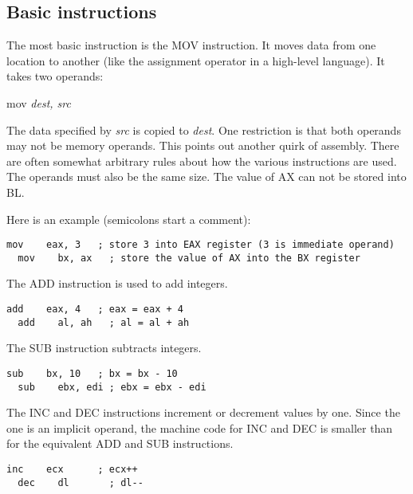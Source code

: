 \subsection{Basic instructions}

The most basic instruction is the {\code MOV}  instruction. It moves
data from one location to another (like the assignment operator in a
high-level language). It takes two operands:
\begin{CodeQuote}
  mov {\em dest, src}
\end{CodeQuote}
The data specified by {\em src} is copied to {\em dest\/}. One restriction
is that both operands may not be memory operands. This points out another
quirk of assembly. There are often somewhat arbitrary rules about how the
various instructions are used. The operands must also be the same size. The
value of AX can not be stored into BL.


Here is an example (semicolons start a comment):
\begin{lstlisting}[language={[x86masm]Assembler}]
  mov    eax, 3   ; store 3 into EAX register (3 is immediate operand)
  mov    bx, ax   ; store the value of AX into the BX register
\end{lstlisting}

The {\code ADD}  instruction is used to add integers.
\begin{lstlisting}[language={[x86masm]Assembler}]
  add    eax, 4   ; eax = eax + 4
  add    al, ah   ; al = al + ah
\end{lstlisting}

The {\code SUB}  instruction subtracts integers.
\begin{lstlisting}[language={[x86masm]Assembler}]
  sub    bx, 10   ; bx = bx - 10
  sub    ebx, edi ; ebx = ebx - edi
\end{lstlisting}

The {\code INC}  and {\code DEC}  instructions
increment or decrement values by one. Since the one is an implicit
operand, the machine code for {\code INC} and {\code DEC} is smaller
than for the equivalent {\code ADD} and {\code SUB} instructions.
\begin{lstlisting}[language={[x86masm]Assembler}]
  inc    ecx      ; ecx++
  dec    dl       ; dl--
\end{lstlisting}

